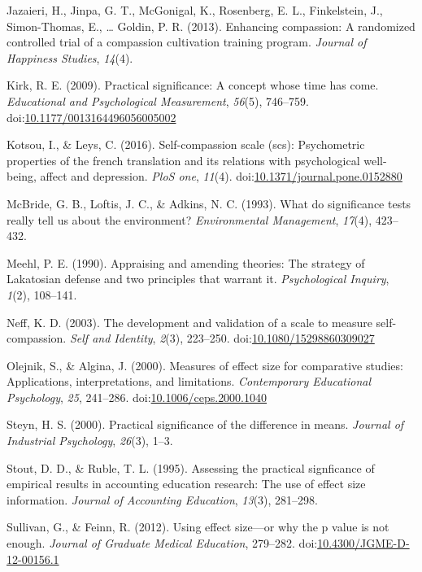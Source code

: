 \documentclass[man]{apa6}
\begin{document}
\leavevmode\hypertarget{ref-Jazaieri_et_al_2013}{}%
Jazaieri, H., Jinpa, G. T., McGonigal, K., Rosenberg, E. L., Finkelstein, J., Simon-Thomas, E., \ldots{} Goldin, P. R. (2013). Enhancing compassion: A randomized controlled trial of a compassion cultivation training program. \emph{Journal of Happiness Studies}, \emph{14}(4).

\leavevmode\hypertarget{ref-Kirk_2009}{}%
Kirk, R. E. (2009). Practical significance: A concept whose time has come. \emph{Educational and Psychological Measurement}, \emph{56}(5), 746--759. doi:\href{https://doi.org/10.1177/0013164496056005002\%20}{10.1177/0013164496056005002 }

\leavevmode\hypertarget{ref-Kostou_et_al_2016}{}%
Kotsou, I., \& Leys, C. (2016). Self-compassion scale (scs): Psychometric properties of the french translation and its relations with psychological well-being, affect and depression. \emph{PloS one}, \emph{11}(4). doi:\href{https://doi.org/10.1371/journal.pone.0152880}{10.1371/journal.pone.0152880}

\leavevmode\hypertarget{ref-McBride_et_al_1993}{}%
McBride, G. B., Loftis, J. C., \& Adkins, N. C. (1993). What do significance tests really tell us about the environment? \emph{Environmental Management}, \emph{17}(4), 423--432.

\leavevmode\hypertarget{ref-Meehl_1990}{}%
Meehl, P. E. (1990). Appraising and amending theories: The strategy of Lakatosian defense and two principles that warrant it. \emph{Psychological Inquiry}, \emph{1}(2), 108--141.

\leavevmode\hypertarget{ref-Neff_2003}{}%
Neff, K. D. (2003). The development and validation of a scale to measure self-compassion. \emph{Self and Identity}, \emph{2}(3), 223--250. doi:\href{https://doi.org/10.1080/15298860309027}{10.1080/15298860309027}

\leavevmode\hypertarget{ref-Olejnik_Algina_2000}{}%
Olejnik, S., \& Algina, J. (2000). Measures of effect size for comparative studies: Applications, interpretations, and limitations. \emph{Contemporary Educational Psychology}, \emph{25}, 241--286. doi:\href{https://doi.org/10.1006/ceps.2000.1040}{10.1006/ceps.2000.1040}

\leavevmode\hypertarget{ref-Steyn_2000}{}%
Steyn, H. S. (2000). Practical significance of the difference in means. \emph{Journal of Industrial Psychology}, \emph{26}(3), 1--3.

\leavevmode\hypertarget{ref-Stout_Ruble_1995}{}%
Stout, D. D., \& Ruble, T. L. (1995). Assessing the practical signficance of empirical results in accounting education research: The use of effect size information. \emph{Journal of Accounting Education}, \emph{13}(3), 281--298.

\leavevmode\hypertarget{ref-Sullivan_Feinn_2012}{}%
Sullivan, G., \& Feinn, R. (2012). Using effect size---or why the p value is not enough. \emph{Journal of Graduate Medical Education}, 279--282. doi:\href{https://doi.org/10.4300/JGME-D-12-00156.1}{10.4300/JGME-D-12-00156.1}
\end{document}
